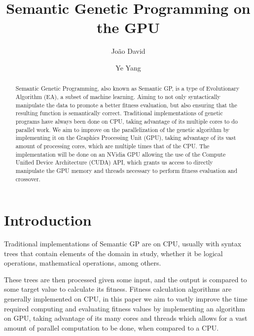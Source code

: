 \documentclass[runningheads]{llncs}
\begin{document}
\title{Semantic Genetic Programming on the GPU}
\author{João David \and
Ye Yang
}


\maketitle

\begin{abstract}
Semantic Genetic Programming, also known as Semantic GP, is a type of Evolutionary Algorithm (EA), a subset of machine learning. 
Aiming to not only syntactically manipulate the data to promote a better fitness evaluation, but also ensuring that the resulting function is semantically correct. Traditional implementations of genetic programs have always been done on CPU, taking advantage of its multiple cores to do parallel work. We aim to improve on the parallelization of the genetic algorithm by implementing it on the Graphics Processing Unit (GPU), taking advantage of its vast amount of processing cores, which are multiple times that of the CPU. The implementation will be done on an NVidia GPU allowing the use of the Compute Unified Device Architecture (CUDA) API, which grants us access to directly manipulate the GPU memory and threads necessary to perform fitness evaluation and crossover.


\end{abstract}
%
%
%
\section{Introduction}

Traditional implementations of Semantic GP are  on CPU, usually with syntax trees that contain elements of the domain in study, whether it be logical operations, mathematical operations, among others.

These trees are then processed given some input, and the output is compared to some target value to calculate its fitness. Fitness calculation algorithms are generally implemented on CPU, in this paper we aim to vastly improve the time required computing and evaluating fitness values by implementing an algorithm on GPU, taking advantage of its many cores and threads which allows for a vast amount of parallel computation to be done, when compared to a CPU.
\end{document}
